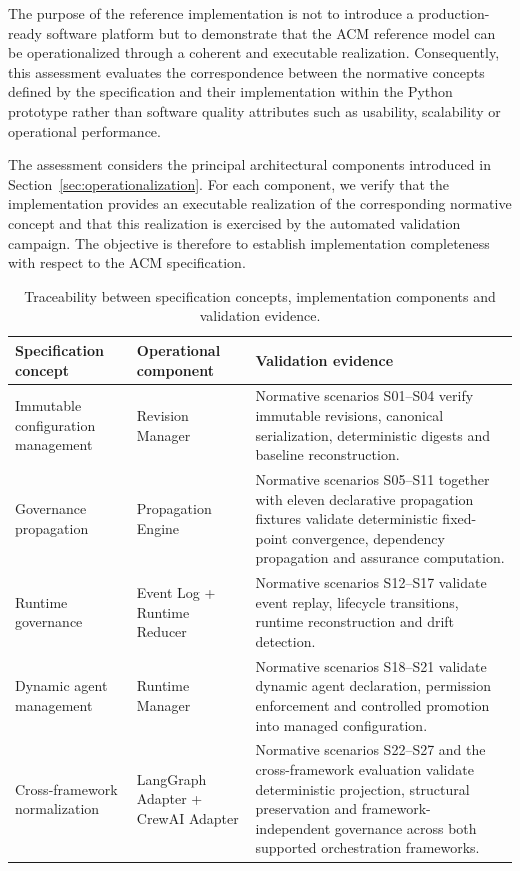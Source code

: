 \documentclass[10pt]{article}
\begin{document}
The purpose of the reference implementation is not to introduce a production-ready software platform but to demonstrate that the ACM reference model can be operationalized through a coherent and executable realization. Consequently, this assessment evaluates the correspondence between the normative concepts defined by the specification and their implementation within the Python prototype rather than software quality attributes such as usability, scalability or operational performance.

The assessment considers the principal architectural components introduced in Section~\ref{sec:operationalization}. For each component, we verify that the implementation provides an executable realization of the corresponding normative concept and that this realization is exercised by the automated validation campaign. The objective is therefore to establish implementation completeness with respect to the ACM specification.

\begin{table}[t]
\centering
\caption{Traceability between specification concepts, implementation components and validation evidence.}
\label{tab:implementation_traceability}
\begin{tabularx}{\textwidth}{l l X}
\toprule
\textbf{Specification concept} &
\textbf{Operational component} &
\textbf{Validation evidence} \\
\midrule

Immutable configuration management &
Revision Manager &
Normative scenarios S01--S04 verify immutable revisions, canonical serialization, deterministic digests and baseline reconstruction. \\

Governance propagation &
Propagation Engine &
Normative scenarios S05--S11 together with eleven declarative propagation fixtures validate deterministic fixed-point convergence, dependency propagation and assurance computation. \\

Runtime governance &
Event Log + Runtime Reducer &
Normative scenarios S12--S17 validate event replay, lifecycle transitions, runtime reconstruction and drift detection. \\

Dynamic agent management &
Runtime Manager &
Normative scenarios S18--S21 validate dynamic agent declaration, permission enforcement and controlled promotion into managed configuration. \\

Cross-framework normalization &
LangGraph Adapter + CrewAI Adapter &
Normative scenarios S22--S27 and the cross-framework evaluation validate deterministic projection, structural preservation and framework-independent governance across both supported orchestration frameworks. \\

\bottomrule
\end{tabularx}
\end{table}
\end{document}
